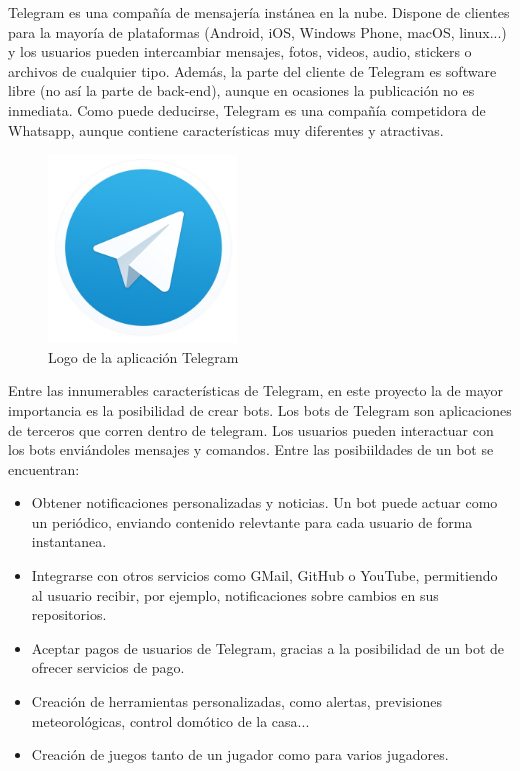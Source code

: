 Telegram es una compañía de mensajería instánea en la nube. Dispone de clientes para la mayoría de plataformas (Android, iOS, Windows Phone, macOS, linux...) y los usuarios pueden intercambiar mensajes, fotos, videos, audio, stickers o archivos de cualquier tipo. Además, la parte del cliente de Telegram es software libre (no así la parte de back-end), aunque en ocasiones la publicación no es inmediata. Como puede deducirse, Telegram es una compañía competidora de Whatsapp, aunque contiene características muy diferentes y atractivas.\\
\begin{figure}[H]
    \centering
    \captionsetup{width=7cm}
    \includegraphics[width=5cm]{contenido/imagenes/Telegram-logo.jpg}
    \caption{Logo de la aplicación Telegram}
\end{figure}
Entre las innumerables características de Telegram, en este proyecto la de mayor importancia es la posibilidad de crear bots. Los bots de Telegram son aplicaciones de terceros que corren dentro de telegram. Los usuarios pueden interactuar con los bots enviándoles mensajes y comandos. Entre las posibiildades de un bot se encuentran:
\begin{itemize}
    \item Obtener notificaciones personalizadas y noticias. Un bot puede actuar como un periódico, enviando contenido relevtante para cada usuario de forma instantanea.
    \item Integrarse con otros servicios como GMail, GitHub o YouTube, permitiendo al usuario recibir, por ejemplo, notificaciones sobre cambios en sus repositorios.
    \item Aceptar pagos de usuarios de Telegram, gracias a la posibilidad de un bot de ofrecer servicios de pago.
    \item Creación de herramientas personalizadas, como alertas, previsiones meteorológicas, control domótico de la casa...
    \item Creación de juegos tanto de un jugador como para varios jugadores.
\end{itemize}

